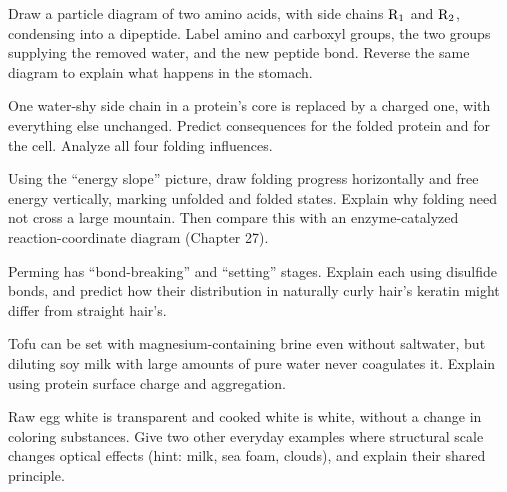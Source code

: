 \begin{sikaoti}
\item Draw a particle diagram of two amino acids, with side chains $\mathrm{R_1}$ and $\mathrm{R_2}$, condensing into a dipeptide. Label amino and carboxyl groups, the two groups supplying the removed water, and the new peptide bond. Reverse the same diagram to explain what happens in the stomach.
\item One water-shy side chain in a protein's core is replaced by a charged one, with everything else unchanged. Predict consequences for the folded protein and for the cell. Analyze all four folding influences.
\item Using the ``energy slope'' picture, draw folding progress horizontally and free energy vertically, marking unfolded and folded states. Explain why folding need not cross a large mountain. Then compare this with an enzyme-catalyzed reaction-coordinate diagram (Chapter 27).
\item Perming has ``bond-breaking'' and ``setting'' stages. Explain each using disulfide bonds, and predict how their distribution in naturally curly hair's keratin might differ from straight hair's.
\item Tofu can be set with magnesium-containing brine even without saltwater, but diluting soy milk with large amounts of pure water never coagulates it. Explain using protein surface charge and aggregation.
\item Raw egg white is transparent and cooked white is white, without a change in coloring substances. Give two other everyday examples where structural scale changes optical effects (hint: milk, sea foam, clouds), and explain their shared principle.
\end{sikaoti}
